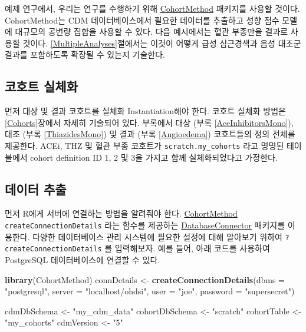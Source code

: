\documentclass[11pt]{book}
\newenvironment{Shaded}{\begin{snugshade}}{\end{snugshade}}
\newcommand{\KeywordTok}[1]{\textcolor[rgb]{0.13,0.29,0.53}{\textbf{#1}}}
\newcommand{\DataTypeTok}[1]{\textcolor[rgb]{0.13,0.29,0.53}{#1}}
\newcommand{\StringTok}[1]{\textcolor[rgb]{0.31,0.60,0.02}{#1}}
\newcommand{\NormalTok}[1]{#1}
\theoremstyle{definition}
\theoremstyle{definition}
\theoremstyle{definition}
\theoremstyle{remark}
\begin{document}
예제 연구에서, 우리는 연구를 수행하기 위해
\href{https://ohdsi.github.io/CohortMethod/}{CohortMethod} 패키지를
사용할 것이다. CohortMethod는 CDM 데이터베이스에서 필요한 데이터를
추출하고 성향 점수 모델에 대규모의 공변량 집합을 사용할 수 있다. 다음
예시에서는 혈관 부종만을 결과로 사용할 것이다.
\ref{MultipleAnalyses}절에서는 이것이 어떻게 급성 심근경색과 음성 대조군
결과를 포함하도록 확장될 수 있는지 기술한다.

\subsection{코호트 실체화}\label{-}

먼저 대상 및 결과 코호트를 실체화 Instantiation해야 한다. 코호트 실체화
방법은 \ref{Cohorts}장에서 자세히 기술되어 있다. 부록에서 대상 (부록
\ref{AceInhibitorsMono}), 대조 (부록 \ref{ThiazidesMono}) 및 결과 (부록
\ref{Angioedema}) 코호트들의 정의 전체를 제공한다. ACEi, THZ 및 혈관
부종 코호트가 \texttt{scratch.my\_cohorts} 라고 명명된 테이블에서 cohort
definition ID 1, 2 및 3을 가지고 함께 실체화되었다고 가정한다.

\subsection{데이터 추출}\label{-}

먼저 R에게 서버에 연결하는 방법을 알려줘야 한다.
\href{https://ohdsi.github.io/CohortMethod/}{CohortMethod}
\texttt{createConnectionDetails} 라는 함수를 제공하는
\href{https://ohdsi.github.io/DatabaseConnector/}{DatabaseConnector}
패키지를 이용한다. 다양한 데이터베이스 관리 시스템에 필요한 설정에 대해
알아보기 위하여 \texttt{?createConnectionDetails} 를 입력해보자. 예를
들어, 아래 코드를 사용하여 PostgreSQL 데이터베이스에 연결할 수 있다.

\begin{Shaded}
\begin{Highlighting}[]
\KeywordTok{library}\NormalTok{(CohortMethod)}
\NormalTok{connDetails <-}\StringTok{ }\KeywordTok{createConnectionDetails}\NormalTok{(}\DataTypeTok{dbms =} \StringTok{"postgresql"}\NormalTok{,}
                                       \DataTypeTok{server =} \StringTok{"localhost/ohdsi"}\NormalTok{,}
                                       \DataTypeTok{user =} \StringTok{"joe"}\NormalTok{,}
                                       \DataTypeTok{password =} \StringTok{"supersecret"}\NormalTok{)}

\NormalTok{cdmDbSchema <-}\StringTok{ "my_cdm_data"}
\NormalTok{cohortDbSchema <-}\StringTok{ "scratch"}
\NormalTok{cohortTable <-}\StringTok{ "my_cohorts"}
\NormalTok{cdmVersion <-}\StringTok{ "5"}
\end{Highlighting}
\end{Shaded}
\end{document}
